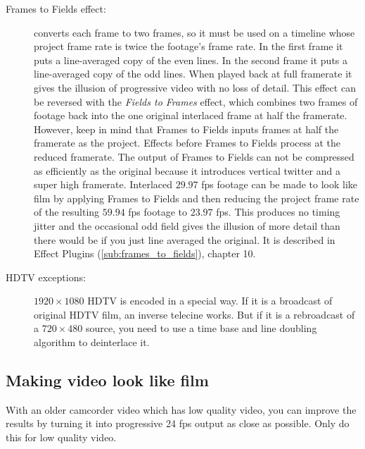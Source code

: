 \begin{description}
	\item[Frames to Fields effect:] converts each frame to two frames, so it must be used on a timeline whose project frame rate is twice the footage's frame rate. In the first frame it puts a line-averaged copy of the even lines. In the second frame it puts a line-averaged copy of the odd lines. When played back at full framerate it gives the illusion of progressive video with no loss of detail. This effect can be reversed with the \textit{Fields to Frames} effect, which combines two frames of footage back into the one original interlaced frame at half the framerate. However, keep in mind that Frames to Fields inputs frames at half the framerate as the project. Effects before Frames to Fields process at the reduced framerate.  The output of Frames to Fields can not be compressed as efficiently as the original because it introduces vertical twitter and a super high framerate. Interlaced $29.97$ fps footage can be made to look like film by applying Frames to Fields and then reducing the project frame rate of the resulting $59.94$ fps footage to $23.97$ fps. This produces no timing jitter and the occasional odd field gives the illusion of more detail than there would be if you just line averaged the original. It is described in Effect Plugins (\ref{sub:frames_to_fields}), chapter 10.
	\item[HDTV exceptions:] $1920\times1080$ HDTV is encoded in a special way. If it is a broadcast of original HDTV film, an inverse telecine works.  But if it is a rebroadcast of a $720\times480$ source, you need to use a time base and line doubling algorithm to deinterlace it.
\end{description}

\subsection{Making video look like film}%
\label{sub:making_video_look_film}

With an older camcorder video which has low quality video, you can improve the results by turning it into progressive 24 fps output as close as possible.  Only do this for low quality video.

